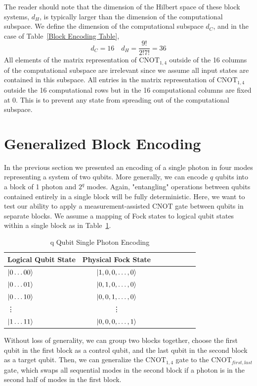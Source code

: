 \documentclass[aps,pra,twocolumn,showpacs,superscriptaddress,floatfix,10pt]{revtex4}
\begin{document}
The reader should note that the dimension of the Hilbert space of these block systems, $d_H$, is typically larger than the dimension of the computational subspace. We define the dimension of the computational subspace $d_C$, and in the case of Table~\ref{Block Encoding Table},
\begin{equation}
d_C = 16 \quad d_H = \frac{9!}{2! 7!} = 36
\end{equation}
All elements of the matrix representation of $\mbox{CNOT}_{1,4}$ outside of the 16 columns of the computational subspace are irrelevant since we assume all input states are contained in this subspace. All entries in the matrix representation of $\mbox{CNOT}_{1,4}$ outside the 16 computational rows but in the 16 computational columns are fixed at 0. This is to prevent any state from spreading out of the computational subspace.
\section{Generalized Block Encoding}
In the previous section we presented an encoding of a single photon in four modes representing a system of two qubits. More generally, we can encode $q$ qubits into a block of 1 photon and $2^q$ modes. Again, "entangling" operations between qubits contained entirely in a single block will be fully deterministic. Here, we want to test our ability to apply a measurement-assisted $\mbox{CNOT}$ gate between qubits in separate blocks.  We assume a  mapping of Fock states to logical qubit states within a single block as in Table~\ref{q Qubit Block Encoding}.
\begin {table}[h]
\begin{center}
	\begin{tabular}{l*{6}{c}r} 
		Logical Qubit State      \quad \quad \quad     & Physical Fock State \\
		\hline 
		\quad \quad \quad $\ket{0\dots00}$     & $\ket{1,0,0,\dots,0}$ \\
		\quad \quad \quad $\ket{0\dots01}$            & $\ket{0,1,0,\dots,0}$ \\
		\quad \quad \quad $\ket{0\dots10}$            & $\ket{0,0,1,\dots,0}$ \\
		\quad \quad \quad \quad \enspace \vdots & \vdots \\
		\quad \quad \quad $\ket{1\dots11}$            & $\ket{0,0,0,\dots,1}$ \\
	\end{tabular}
	\caption{ \label{q Qubit Block Encoding} q Qubit Single Photon Encoding}
\end{center}
\end{table}
Without loss of generality, we can group two blocks together, choose the first qubit in the first block as a control qubit, and the last qubit in the second block as a target qubit. Then, we can generalize the $\mbox{CNOT}_{1,4}$ gate to the $\mbox{CNOT}_{first,last}$ gate, which swaps all sequential modes in the second block if a photon is in the second half of modes in the first block. 
\end{document}
